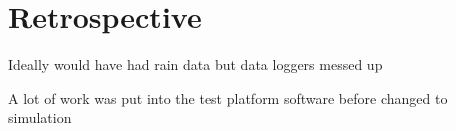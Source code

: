 \chapter{Retrospective}
Ideally would have had rain data but data loggers messed up

A lot of work was put into the test platform software before changed to simulation

% 
